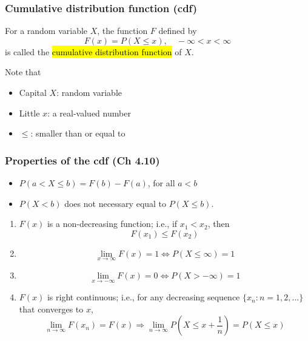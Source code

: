 \documentclass[slidestop,compress,mathserif]{beamer}
\begin{document}
\begin{frame}\frametitle{Cumulative distribution function (cdf)}
\begin{defn}
For a random variable $X$, the function $F$ defined by
\[ F(x) = P(X \leq x), \quad  -\infty < x < \infty \]
is called the \hl{cumulative distribution function} of $X$.
\end{defn}

\pause
Note that
\begin{itemize}
\item Capital $X$: random variable
\item Little $x$: a real-valued number
\item $\leq$: smaller than or equal to
\end{itemize}

\end{frame}

\begin{frame}\frametitle{Properties of the cdf (Ch 4.10)}

\begin{itemize}
\item $P(a < X \leq b) = F(b) - F(a)$, for all $a<b$

\item $P(X < b)$ does not necessary equal to $P(X\leq b)$.
\end{itemize}

\begin{enumerate}
\item $F(x)$ is a non-decreasing function; i.e., if $x_1 < x_2$, then
\[F(x_1) \leq F(x_2)\]

\vspace{-0.5cm}
\item \[ \lim_{x \rightarrow \infty} F(x) = 1 \Longleftrightarrow P(X \leq \infty) = 1\]

\vspace{-0.5cm}
\item \[ \lim_{x \rightarrow -\infty} F(x) = 0 \Longleftrightarrow P(X > -\infty) = 1\]

\vspace{-0.1cm}
\item $F(x)$ is right continuous; i.e., for any decreasing sequence $\{x_n: n = 1, 2, \ldots \}$ that converges to $x$,
\[ \lim_{n\rightarrow \infty}F(x_n) = F(x)\Longrightarrow \lim_{n\rightarrow \infty}P(X \leq x + \frac{1}{n}) = P(X \leq x)\]
\end{enumerate}


\end{frame}
\end{document}

